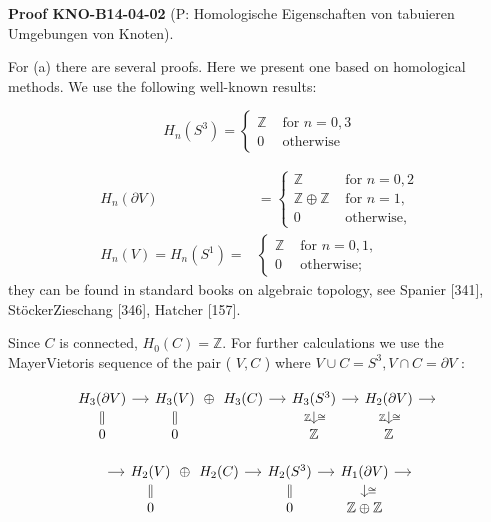 \documentclass[10pt, letterpaper]{article}
\newcommand{\CustomHeading}[3]{%
  \par\medskip\noindent%
  \textbf{#1 #2} \textnormal{(#3)}.\enskip%
}
\newenvironment{PROOF}[2]{\begin{unitbox}\CustomHeading{Proof}{#1}{#2}}{\end{unitbox}}
\begin{document}
\begin{PROOF}{KNO-B14-04-02}{P: Homologische Eigenschaften von tabuieren Umgebungen von Knoten}
For (a) there are several proofs. Here we present one based on homological methods. We use the following well-known results:

$$
H_{n}\left(S^{3}\right)= \begin{cases}\mathbb{Z} & \text { for } n=0,3 \\ 0 & \text { otherwise }\end{cases}
$$

$$
\begin{aligned}
H_{n}(\partial V) & = \begin{cases}\mathbb{Z} & \text { for } n=0,2 \\
\mathbb{Z} \oplus \mathbb{Z} & \text { for } n=1, \\
0 & \text { otherwise, }\end{cases} \\
H_{n}(V)=H_{n}\left(S^{1}\right)= & \begin{cases}\mathbb{Z} & \text { for } n=0,1, \\
0 & \text { otherwise; }\end{cases}
\end{aligned}
$$
they can be found in standard books on algebraic topology, see Spanier [341], StöckerZieschang [346], Hatcher [157].

Since $C$ is connected, $H_{0}(C)=\mathbb{Z}$. For further calculations we use the MayerVietoris sequence of the pair ( $V, C$ ) where $V \cup C=S^{3}, V \cap C=\partial V$ :

\[
\begin{tikzcd}[row sep=small, column sep=small]
H_3(\partial V) \arrow[r] \arrow[d, equal] 
  & H_3(V) \arrow[r, phantom, "\oplus"] \arrow[d, equal] 
  & H_3(C) \arrow[r] 
  & H_3(S^3) \arrow[r] \arrow[d, "\cong", "\mathbb{Z}"']
  & H_2(\partial V) \arrow[r] \arrow[d, "\cong", "\mathbb{Z}"'] 
  & {} \\
0 & 0 & {} & \mathbb{Z} & \mathbb{Z} & {}
\end{tikzcd}
\]

\[
\begin{tikzcd}[row sep=small, column sep=small]
{} \arrow[r]
  & H_2(V) \arrow[r, phantom, "\oplus"] \arrow[d, equal]
  & H_2(C) \arrow[r] 
  & H_2(S^3) \arrow[r] \arrow[d, equal]
  & H_1(\partial V) \arrow[r] \arrow[d, "\cong"]
  & {} \\
{} & 0 & {}& 0 & \mathbb{Z} \oplus \mathbb{Z} & {}
\end{tikzcd}
\]


\end{PROOF}
\end{document}
